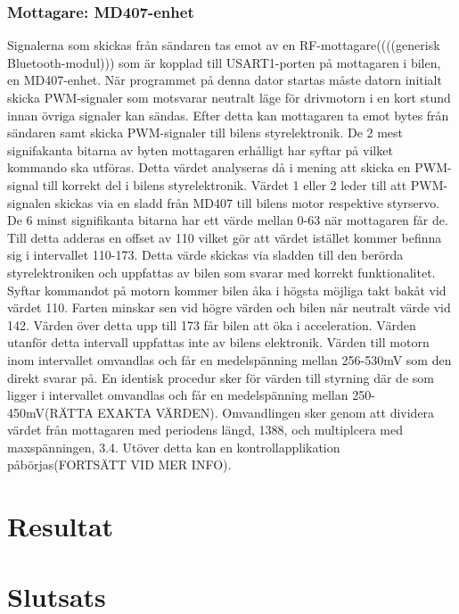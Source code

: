 \documentclass[a4paper]{article}
\begin{document}
\subsubsection{Mottagare: MD407-enhet}
Signalerna som skickas från sändaren tas emot av en RF-mottagare((((generisk Bluetooth-modul))) som är kopplad till USART1-porten på mottagaren i bilen, en MD407-enhet. När programmet på denna dator startas måste datorn initialt skicka PWM-signaler som motsvarar neutralt läge för drivmotorn i en kort stund innan övriga signaler kan sändas. Efter detta kan mottagaren ta emot bytes från sändaren samt skicka PWM-signaler till bilens styrelektronik. De 2 mest signifakanta bitarna av byten mottagaren erhålligt har syftar på vilket kommando ska utföras. Detta värdet analyseras då i mening att skicka en PWM-signal till korrekt del i bilens styrelektronik. Värdet 1 eller 2 leder till att PWM-signalen skickas via en sladd från MD407 till bilens motor respektive styrservo. De 6 minst signifikanta bitarna har ett värde mellan 0-63 när mottagaren får de. Till detta adderas en offset av 110 vilket gör att värdet istället kommer befinna sig i intervallet 110-173. Detta värde skickas via sladden till den berörda styrelektroniken och uppfattas av bilen som svarar med korrekt funktionalitet. Syftar kommandot på motorn kommer bilen åka i högsta möjliga takt bakåt vid värdet 110. Farten minskar sen vid högre värden och bilen når neutralt värde vid 142. Värden över detta upp till 173 får bilen att öka i acceleration. Värden utanför detta intervall uppfattas inte av bilens elektronik. Värden till motorn inom intervallet omvandlas och får en medelspänning mellan 256-530mV som den direkt svarar på. En identisk procedur sker för värden till styrning där de som ligger i intervallet omvandlas och får en medelspänning mellan 250-450mV(RÄTTA EXAKTA VÄRDEN). Omvandlingen sker genom att dividera värdet från mottagaren med periodens längd, 1388, och multiplcera med maxspänningen, 3.4. Utöver detta kan en kontrollapplikation påbörjas(FORTSÄTT VID MER INFO). 








\newpage
\section{Resultat}






\newpage
\section{Slutsats}



\newpage


\end{document}
